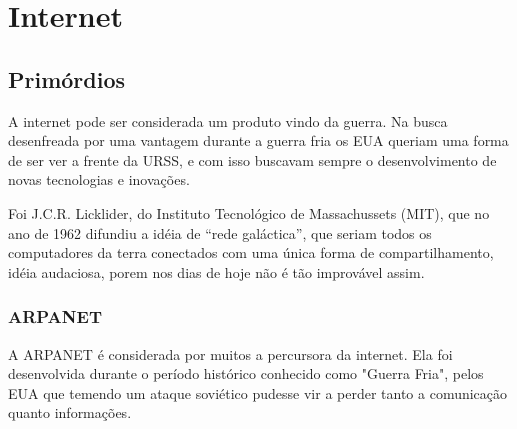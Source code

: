 \documentclass[
	12pt,				%
	openright,			%
	twoside,			%
	a4paper,			%
	Times,
	brazil,				%
	]{abntex2}
\begin{document}
\tableofcontents*
\cleardoublepage


\textual





\chapter{Internet}
\section{Primórdios}

A internet pode ser considerada um produto vindo da guerra. Na busca desenfreada por uma vantagem durante a guerra fria os EUA queriam uma forma de ser ver a frente da URSS, e com isso buscavam sempre o desenvolvimento de novas tecnologias e inovações. \cite{historia-internt}
\par

Foi J.C.R. Licklider, do Instituto Tecnológico de Massachussets (MIT), que no ano de 1962 difundiu a idéia de  “rede galáctica”, que seriam todos os computadores da terra conectados com uma única forma de compartilhamento, idéia audaciosa, porem nos dias de hoje não é tão improvável assim. \cite{historia-internt}
\par

\subsection{ARPANET}

A ARPANET é considerada por muitos a percursora da internet. Ela foi desenvolvida durante o período histórico conhecido como "Guerra Fria", pelos EUA que temendo um ataque soviético pudesse vir a perder tanto a comunicação quanto informações. \cite{ARPANET}
\par
\end{document}
